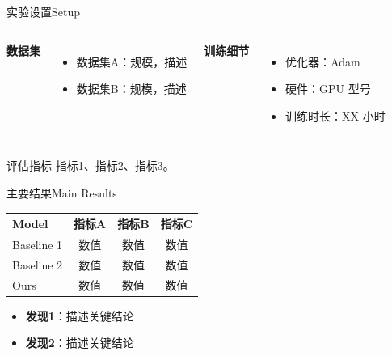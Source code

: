 

\begin{frame}{实验设置}{Setup}
  \begin{columns}[T, onlytextwidth]
      \textbf{\color{mustblue}数据集}
      \begin{itemize}
        \footnotesize
        \item 数据集A：规模，描述
        \item 数据集B：规模，描述
      \end{itemize}
      \textbf{\color{mustblue}训练细节}
      \begin{itemize}
        \footnotesize
        \item 优化器：Adam
        \item 硬件：GPU 型号
        \item 训练时长：XX 小时
      \end{itemize}
  \end{columns}

  \vspace{0.4em}
  \begin{block}{评估指标}
    \footnotesize
    指标1、指标2、指标3。
  \end{block}
\end{frame}

\begin{frame}{主要结果}{Main Results}
  \begin{table}
    \centering\small
    \begin{tabular}{lccc}
      \toprule
      \textbf{Model} & \textbf{指标A} & \textbf{指标B} & \textbf{指标C} \\
      \midrule
      Baseline 1       & 数值 & 数值 & 数值 \\
      Baseline 2       & 数值 & 数值 & 数值 \\
      \alert{Ours}     & \alert{数值} & \alert{数值} & \alert{数值} \\
      \bottomrule
    \end{tabular}
  \end{table}

  \vspace{0.4em}
  \begin{itemize}
    \item \textbf{发现1}：描述关键结论
    \item \textbf{发现2}：描述关键结论
  \end{itemize}
\end{frame}

